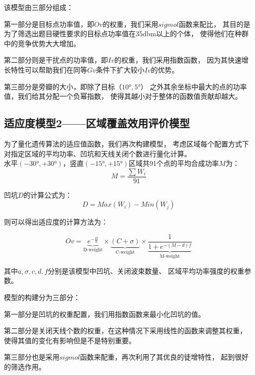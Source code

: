 \documentclass[UTF8,12pt]{ctexart}
\begin{document}
\noindent 该模型由三部分组成：\par
第一部分是目标点功率值，即$Ov$的权重，我们采用$sigmol$函数来配比，
其目的是为了筛选出题目硬性要求的目标点功率值在35dbm以上的个体，
使得他们在种群中的竞争优势大大增加。\par
第二部分则是干扰点的功率值，即$Iv$的权重，我们采用指数函数，
因为其快速增长特性可以帮助我们在同等$Gv$条件下扩大较小$Iv$的优势。\par
第三部分是旁瓣的大小，即除了目标（$10°,5°$）
之外其余坐标中最大的点的功率值，我们给其分配一个负幂指数，
使得其越小对于整体的函数值贡献却越大。

\newpage
\subsection[适应度模型2]{适应度模型2——区域覆盖效用评价模型}\label{SYDE}
为了量化遗传算法的适应值函数，我们再次构建模型，
考虑区域每个配置方式下对指定区域的平均功率、凹坑和天线关闭个数进行量化计算。\\
水平$(-30°,+30°)$，竖直$(-15°,+15°)$区域共91个点的平均合成功率$M$为：
$$M = \frac {\sum{W_i}} {91}$$

\noindent 凹坑$D$的计算公式为：
$$D = Max(W_i)-Min(W_j)$$

\noindent 则可以得出适应度的计算方法为：
\begin{Large}
    $$Ov = \underbrace{e^{-\frac {D}{a}}}_{\text{D-weight}}×\underbrace{(C+σ)}_{\text{C-weight}}× \underbrace{\frac {1}{1+e^{-(M-d)f}}}_{\text{M-weight}}$$
\end{Large}
其中$a,σ,c,d,f$分别是该模型中凹坑、关闭波束数量、
区域平均功率强度的权重参数。\par

\noindent 模型的构建分为三部分：\par
第一部分是凹坑的权重配置，我们用指数函数来最小化凹坑的值。\par
第二部分是关闭天线个数的权重，在这种情况下采用线性的函数来调整其权重，
使得其值的变化有影响但是不是特别重要。\par
第三部分也是采用$sigmol$函数来配重，再次利用了其优良的徒增特性，
起到很好的筛选作用。
\end{document}
